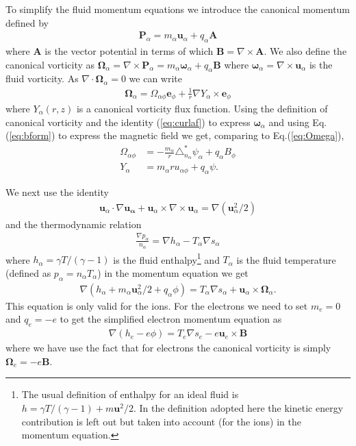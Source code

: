\documentclass[11pt, reqno]{amsart}
\newcommand{\eqr}[1]{Eq.\thinspace(#1)}
\newcommand{\mvec}[1]{\mathbf{#1}}
\newcommand{\gvec}[1]{\boldsymbol{#1}}
\newcommand{\eep}{\mvec{e}_\phi}
\theoremstyle{definition}
\begin{document}
To simplify the fluid momentum equations we introduce the canonical
momentum defined by
\begin{align}
  \mvec{P}_\alpha = m_\alpha\mvec{u}_\alpha + q_\alpha \mvec{A}
\end{align}
where $\mvec{A}$ is the vector potential in terms of which $\mvec{B} =
\nabla\times \mvec{A}$. We also define the canonical vorticity as
$\mvec{\Omega}_\alpha = \nabla\times \mvec{P}_\alpha =
m_\alpha\gvec{\omega}_\alpha + q_\alpha \mvec{B}$ where
$\gvec{\omega}_\alpha=\nabla\times \mvec{u}_\alpha$ is the fluid
vorticity. As $\nabla\cdot\mvec{\Omega}_\alpha = 0$ we can write
\begin{align}
  \mvec{\Omega}_\alpha = \Omega_{\alpha \phi} \eep + \frac{1}{r}\nabla
  Y_{\alpha}\times \eep \label{eq:Omega}
\end{align}
where $Y_\alpha(r,z)$ is a canonical vorticity flux function. Using
the definition of canonical vorticity and the identity
(\ref{eq:curlaf}) to express $\gvec{\omega}_\alpha$ and using
\eqr{\ref{eq:bform}} to express the magnetic field we get, comparing
to \eqr{\ref{eq:Omega}},
\begin{align}
  \Omega_{\alpha\phi} &=
  -\frac{m_\alpha}{r}\triangle^*_{n_\alpha}\psi_\alpha
  + q_\alpha B_\phi \\
  Y_\alpha &=
  m_\alpha r u_{\alpha\phi} + q_\alpha \psi.
\end{align}

We next use the identity
\begin{align}
  \mvec{u}_\alpha\cdot\nabla\mvec{u_\alpha} 
  + \mvec{u}_\alpha\times\nabla\times\mvec{u}_\alpha
  = \nabla(\mvec{u}_\alpha^2/2)
\end{align}
and the thermodynamic relation
\begin{align}
  \frac{\nabla p_\alpha}{n_\alpha} = \nabla h_\alpha - T_\alpha\nabla s_\alpha
\end{align}
where $h_\alpha = \gamma T/(\gamma-1)$ is the fluid
enthalpy\footnote{The usual definition of enthalpy for an ideal fluid
  is $h = \gamma T/(\gamma-1) + m\mvec{u}^2/2$. In the definition
  adopted here the kinetic energy contribution is left out but taken
  into account (for the ions) in the momentum equation.} and
$T_\alpha$ is the fluid temperature (defined as $p_\alpha = n_\alpha
T_\alpha$) in the momentum equation we get
\begin{align}
  \nabla\left(
    h_\alpha
    +
    m_\alpha \mvec{u}_\alpha^2/2 + q_\alpha\phi
    \right)
    =
    T_\alpha \nabla s_\alpha + 
    \mvec{u}_\alpha\times \mvec{\Omega}_\alpha.
    \label{eq:ionMom}
\end{align}
This equation is only valid for the ions. For the electrons we need to
set $m_e=0$ and $q_e = -e$ to get the simplified electron momentum
equation as
\begin{align}
  \nabla\left(
    h_e - e\phi
    \right)
    =
    T_e \nabla s_e - e \mvec{u}_e\times \mvec{B}
    \label{eq:elcMom}
\end{align}
where we have use the fact that for electrons the canonical vorticity
is simply $\mvec{\Omega}_e = -e\mvec{B}$.
\end{document}
